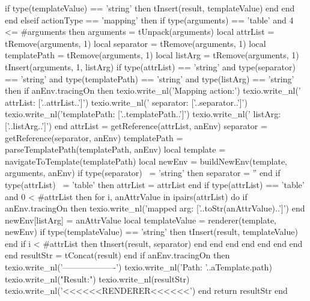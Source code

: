 {{              if type(templateValue) == 'string' then
                tInsert(result, templateValue)
              end
            end
          end
        elseif actionType == 'mapping' then
          if type(arguments) == 'table' and 4 <= #arguments then
            arguments = { tUnpack(arguments) }
            local attrList     = tRemove(arguments, 1)
            local separator    = tRemove(arguments, 1)
            local templatePath = tRemove(arguments, 1)
            local listArg      = tRemove(arguments, 1)
            tInsert(arguments, 1, listArg)
            if type(attrList)     == 'string' and
               type(separator)    == 'string' and
               type(templatePath) == 'string' and
               type(listArg)      == 'string' then
              if anEnv.tracingOn then
                texio.write_nl('Mapping action:')
                texio.write_nl('    attrList: ['..attrList..']')
                texio.write_nl('   separator: ['..separator..']')
                texio.write_nl('templatePath: ['..templatePath..']')
                texio.write_nl('     listArg: ['..listArg..']')
              end
              attrList       = getReference(attrList,  anEnv)
              separator      = getReference(separator, anEnv)
              templatePath   = parseTemplatePath(templatePath, anEnv)
              local template = navigateToTemplate(templatePath)
              local newEnv   = buildNewEnv(template, arguments, anEnv)
              if type(separator) ~= 'string' then
                separator = ''
              end
              if type(attrList) ~= 'table' then
                attrList = { attrList }
              end
              if type(attrList) == 'table' and 0 < #attrList then
                for i, anAttrValue in ipairs(attrList) do
                  if anEnv.tracingOn then
                    texio.write_nl('mapped arg: ['..toStr(anAttrValue)..']')
                  end
                  newEnv[listArg] = anAttrValue
                  local templateValue = renderer(template, newEnv)
                  if type(templateValue) == 'string' then
                    tInsert(result, templateValue)
                  end
                  if i < #attrList then
                    tInsert(result, separator)
                  end
                end
              end
            end
          end
        end
      end
    end
    resultStr = tConcat(result)
  end
  if anEnv.tracingOn then
    texio.write_nl('-------------------')
    texio.write_nl('Path: '..aTemplate.path)
    texio.write_nl("Result:")
    texio.write_nl(resultStr)
    texio.write_nl('<<<<<<RENDERER<<<<<<')
  end
  return resultStr
end

}}

